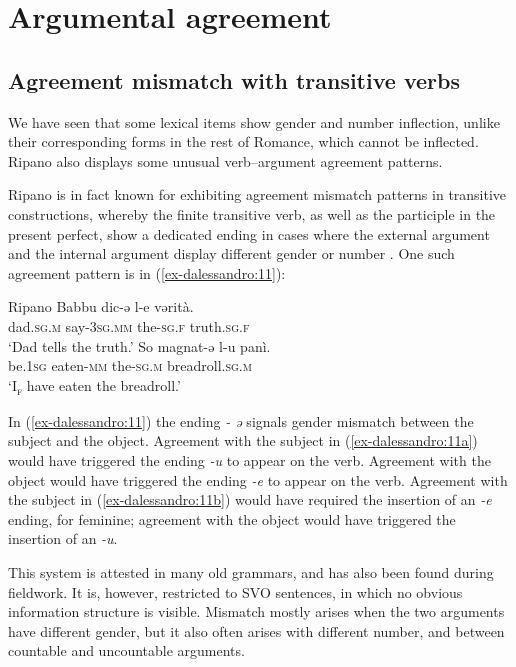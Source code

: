 \documentclass[output=paper
,modfonts
,nonflat]{langsci/langscibook}
\begin{document}
\section{Argumental agreement} \label{sec-dalessandro:2}
\subsection{Agreement mismatch with transitive verbs} \label{sec-dalessandro:2.1}
We have seen that some lexical items show gender and number inflection, unlike their corresponding forms in the rest of Romance, which cannot be inflected. Ripano also displays some unusual verb--argument agreement patterns.

Ripano is in fact known for exhibiting agreement mismatch patterns in transitive constructions, whereby the finite transitive verb, as well as the participle in the present perfect, show a dedicated ending in cases where the external argument and the internal argument display different gender or number \citep{D`Alessandro2017}. One such agreement pattern is in (\ref{ex-dalessandro:11}):

\begin{exe}
	\ex \label{ex-dalessandro:11}Ripano \citep[107]{Mancini1988/1997} \xlist
	\ex \label{ex-dalessandro:11a}
	\gll Babbu dic-ə     l-e     vərità. \\
	dad.\textsc{sg.m} say-\textsc{3sg.mm}     the-\textsc{sg.f}   truth.\textsc{sg.f}\\
	\glt `Dad tells the truth.' 
	\ex \label{ex-dalessandro:11b}
	\gll  So magnat-ə   l-u       panì.\\
	be.\textsc{1sg} eaten-\textsc{mm}\footnotemark {} the-\textsc{sg.m}   breadroll.\textsc{sg.m}\\
	\glt `I\textsc{\textsubscript{f}} have eaten the breadroll.'
	\endxlist
\end{exe}
In (\ref{ex-dalessandro:11}) the ending \textit{- ə} signals gender mismatch between the subject and the object. Agreement with the subject in (\ref{ex-dalessandro:11a}) would have triggered the ending \textit{-u} to appear on the verb. Agreement with the object would have triggered the ending \textit{-e} to appear on the verb. Agreement with the subject in (\ref{ex-dalessandro:11b}) would have required the insertion of an \textit{-e} ending, for feminine; agreement with the object would have triggered the insertion of an \textit{-u}.

This system is attested in many old grammars, and has also been found during fieldwork. It is, however, restricted to SVO sentences, in which no obvious information structure is visible. Mismatch mostly arises when the two arguments have different gender, but it also often arises with different number, and between countable and uncountable arguments.
\end{document}
